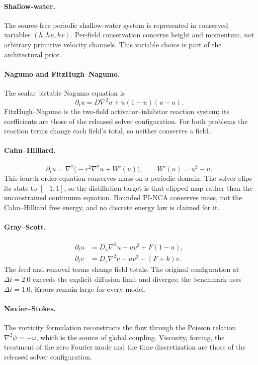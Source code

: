 \paragraph{Shallow-water.}
The source-free periodic shallow-water system is represented in conserved variables
$(h,hu,hv)$. Per-field conservation concerns height and momentum, not arbitrary
primitive velocity channels. This variable choice is part of the architectural prior.

\paragraph{Nagumo and FitzHugh--Nagumo.}
The scalar bistable Nagumo equation is
\begin{equation}
 \partial_tu=D\nabla^2u+u(1-u)(u-a).
\end{equation}
FitzHugh--Nagumo is the two-field activator--inhibitor reaction system; its
coefficients are those of the released solver configuration. For both problems the
reaction terms change each field's total, so neither conserves a field.

\paragraph{Cahn--Hilliard.}
\begin{equation}
 \partial_tu=\nabla^2\bigl(-\varepsilon^2\nabla^2u+W'(u)\bigr),
 \qquad W'(u)=u^3-u.
\end{equation}
This fourth-order equation conserves mass on a periodic domain. The solver clips its
state to $[-1,1]$, so the distillation target is that clipped map rather than the
unconstrained continuum equation. Bounded PI-NCA conserves mass, not the Cahn--Hilliard
free energy, and no discrete energy law is claimed for it.

\paragraph{Gray--Scott.}
\begin{align}
 \partial_tu&=D_u\nabla^2u-uv^2+F(1-u),\\
 \partial_tv&=D_v\nabla^2v+uv^2-(F+k)v.
\end{align}
The feed and removal terms change field totals. The original configuration at
$\Delta t=2.0$ exceeds the explicit diffusion limit and diverges; the benchmark uses
$\Delta t=1.0$. Errors remain large for every model.

\paragraph{Navier--Stokes.}
The vorticity formulation reconstructs the flow through the Poisson relation
$\nabla^2\psi=-\omega$, which is the source of global coupling. Viscosity, forcing,
the treatment of the zero Fourier mode and the time discretization are those of the
released solver configuration.

